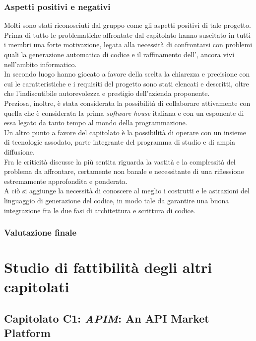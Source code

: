 		\subsubsection{Aspetti positivi e negativi}
		Molti sono stati riconosciuti dal gruppo come gli aspetti positivi di tale progetto.
		\\Prima di tutto le problematiche affrontate dal capitolato hanno suscitato in tutti i membri una forte motivazione, legata alla necessità di confrontarsi 
		con problemi quali la generazione automatica di codice e il raffinamento dell', ancora vivi nell'ambito informatico.
		\\In secondo luogo hanno giocato 
		a favore della scelta la chiarezza e precisione con cui le caratteristiche e i requisiti del progetto sono stati elencati e descritti, oltre che l'indiscutibile 
		autorevolezza e prestigio dell'azienda proponente. 
		\\Preziosa, inoltre, è stata considerata la possibilità di collaborare attivamente con quella che è considerata 
		la prima \emph{software house} italiana e con un esponente di essa legato da tanto tempo al mondo della programmazione.
		\\Un altro punto a favore del capitolato è la possibilità di operare con un insieme di tecnologie assodato, parte integrante del programma di studio e di ampia diffusione.
		\\Fra le criticità discusse la più sentita riguarda la vastità e la complessità del problema da affrontare, certamente non banale e necessitante di una riflessione 
		estremamente approfondita e ponderata.
		\\A ciò si aggiunge la necessità di conoscere al meglio i costrutti e le astrazioni del linguaggio di generazione del codice, 
		in modo tale da garantire una buona integrazione fra le due fasi di architettura e scrittura di codice.
		\subsubsection{Valutazione finale}
	
\newpage

\section{Studio di fattibilità degli altri capitolati}
	\subsection{Capitolato C1: \emph{APIM}: An API Market Platform}
